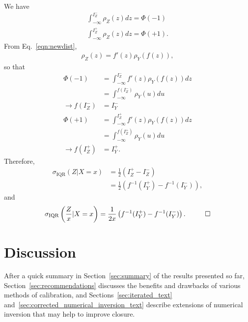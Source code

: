 We have
\begin{align}
\int_{-\infty}^{I_Z^-}\rho_Z(z)dz = \Phi(-1)\\
\int_{-\infty}^{I_Z^+}\rho_Z(z)dz = \Phi(+1).
\end{align}
From Eq.~\ref{eqn:newdist},
\begin{align}
\rho_Z(z) = f'(z)\rho_Y(f(z)),
\end{align}
so that
\begin{align}
\Phi(-1) &= \int_{-\infty}^{I_Z^-}f'(z)\rho_Y(f(z))dz\nonumber\\
&=\int_{-\infty}^{f(I_Z^-)}\rho_Y(u)du\nonumber\\
\rightarrow f(I_Z^-) &= I_Y^-\\
\Phi(+1) &= \int_{-\infty}^{I_Z^+}f'(z)\rho_Y(f(z))dz\nonumber\\
&=\int_{-\infty}^{f(I_Z^+)}\rho_Y(u)du\nonumber\\
\rightarrow f(I_Z^+) &= I_Y^+.
\end{align}
Therefore,
\begin{align}
\sigma_\text{IQR}(Z|X=x) &= \frac{1}{2}\left(I_Z^+-I_Z^-\right)\nonumber\\
&=\frac{1}{2}\left(f^{-1}(I_Y^+)-f^{-1}(I_Y^-)\right),
\end{align}
and
\begin{align}
\sigma_\text{IQR}\left(\frac{Z}{x}|X=x\right)=\frac{1}{2x}\left(f^{-1}(I_Y^+)-f^{-1}(I_Y^-)\right).\hspace{1 cm}\Box
\label{eqn:resolutionmedian_text}
\end{align}
\newpage
\section{Discussion}
\label{sec:discussion}

After a quick summary in Section~\ref{sec:summary} of the results presented so far, Section~\ref{sec:recommendations} discusses the benefits and drawbacks of various methods of calibration, and Sections~\ref{sec:iterated_text} and~\ref{sec:corrected_numerical_inversion_text} describe extensions of numerical inversion that may help to improve closure.

